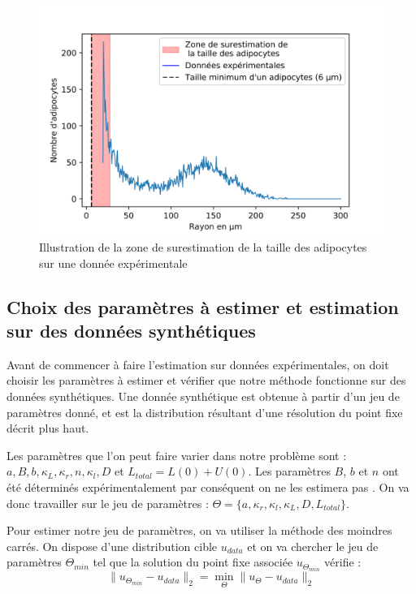 \documentclass[a4paper,fleqn,leqno]{article}
\begin{document}
\begin{figure}[H]
\centering
\includegraphics[scale=1]{data}
\caption{Illustration de la zone de surestimation de la taille des adipocytes sur une donnée expérimentale}
\label{figure:1}
\end{figure}


\subsection{Choix des paramètres à estimer et estimation sur des données synthétiques}

Avant de commencer à faire l'estimation sur données expérimentales, on doit choisir les paramètres à estimer et vérifier que notre méthode fonctionne sur des données synthétiques. Une donnée synthétique est obtenue à partir d'un jeu de paramètres donné, et est la distribution résultant d'une résolution du point fixe décrit plus haut.
 
Les paramètres que l'on peut faire varier dans notre problème sont : $a, B, b, \kappa_L, \kappa_r, n, \kappa_l, D$ et $L_{total} = L(0) + U(0)$. Les paramètres $B$, $b$ et $n$ ont été déterminés expérimentalement par conséquent on ne les estimera pas \cite{Soula2013}. On va donc travailler sur le jeu de paramètres : $\Theta = \{a,\kappa_r,\kappa_l,\kappa_L,D,L_{total}\}$.

Pour estimer notre jeu de paramètres, on va utiliser la méthode des moindres carrés. On dispose d'une distribution cible $u_{data}$ et on va chercher le jeu de paramètres $\Theta_{min}$ tel que la solution du point fixe associée $u_{\Theta_{min}}$ vérifie :
\[ \lVert u_{\Theta_{min}} - u_{data} \rVert_2 = \min_\Theta \lVert u_{\Theta} - u_{data} \rVert_2 \]
\end{document}
